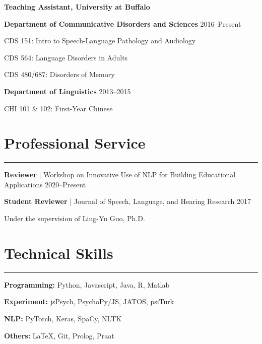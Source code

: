 \documentclass[11pt]{article}
\newcommand{\cvsection}[1]{\vspace{-0.2cm}\section*{\Large #1}\vspace{-0.2cm}\hrule\vspace{0.2cm}}
\begin{document}
\textbf{Teaching Assistant, University at Buffalo}

\textbf{Department of Communicative Disorders and Sciences} \hfill 2016--Present

\quad CDS 151: Intro to Speech-Language Pathology and Audiology

\quad CDS 564: Language Disorders in Adults

\quad CDS 480/687: Disorders of Memory

\textbf{Department of Linguistics} \hfill 2013--2015

\quad CHI 101 \& 102: First-Year Chinese


\cvsection{Professional Service}

\textbf{Reviewer} | Workshop on Innovative Use of NLP for Building Educational Applications \hfill 2020--Present

\textbf{Student Reviewer} | Journal of Speech, Language, and Hearing Research \hfill 2017

\quad Under the supervision of Ling-Yu Guo, Ph.D.

\cvsection{Technical Skills}

\textbf{Programming:} Python, Javascript, Java, R, Matlab

\textbf{Experiment:} jsPsych, PsychoPy/JS, JATOS, psiTurk

\textbf{NLP:} PyTorch, Keras, SpaCy, NLTK

\textbf{Others:} \LaTeX, Git, Prolog, Praat





\end{document}
